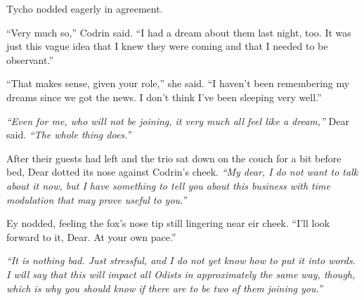 Tycho nodded eagerly in agreement.

``Very much so,'' Codrin said. ``I had a dream about them last night, too. It was just this vague idea that I knew they were coming and that I needed to be observant.''

``That makes sense, given your role,'' she said. ``I haven't been remembering my dreams since we got the news. I don't think I've been sleeping very well.''

\emph{``Even for me, who will not be joining, it very much all feel like a dream,''} Dear said. \emph{``The whole thing does.''}

After their guests had left and the trio sat down on the couch for a bit before bed, Dear dotted its nose against Codrin's cheek. \emph{``My dear, I do not want to talk about it now, but I have something to tell you about this business with time modulation that may prove useful to you.''}

Ey nodded, feeling the fox's nose tip still lingering near eir cheek. ``I'll look forward to it, Dear. At your own pace.''

\emph{``It is nothing bad. Just stressful, and I do not yet know how to put it into words. I will say that this will impact all Odists in approximately the same way, though, which is why you should know if there are to be two of them joining you.''}
